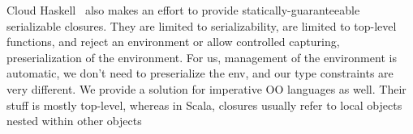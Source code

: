 \documentclass{llncs}
\begin{document}
Cloud Haskell~\cite{CloudHaskell} also makes an effort to provide statically-guaranteeable serializable closures. They are limited to serializability, are
limited to top-level functions, and reject an environment or allow controlled
capturing, preserialization of the environment.  For us, management of the
environment is automatic, we don't need to preserialize the env, and our type
constraints are very different. We provide a solution for imperative OO languages 
as well. Their stuff is mostly top-level, whereas in Scala, closures usually refer 
to local objects nested within other objects









\end{document}
